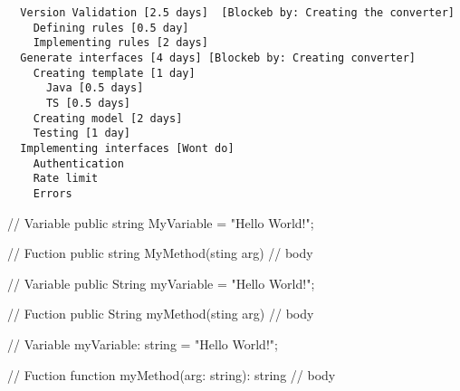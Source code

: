 \begin{itemize}
\begin{verbatim}
  Version Validation [2.5 days]  [Blockeb by: Creating the converter]
    Defining rules [0.5 day]
    Implementing rules [2 days]
  Generate interfaces [4 days] [Blockeb by: Creating converter]
    Creating template [1 day]
      Java [0.5 days]
      TS [0.5 days]
    Creating model [2 days]
    Testing [1 day]
  Implementing interfaces [Wont do]
    Authentication
    Rate limit
    Errors
    \end{verbatim}
    

\begin{csharp}
// Variable
public string MyVariable = "Hello World!";

// Fuction
public string MyMethod(sting arg)
{
  // body
}
\end{csharp}

\begin{java}
// Variable
public String myVariable = "Hello World!";

// Fuction
public String myMethod(sting arg)
{
  // body
}
\end{java}

\begin{typescript}
// Variable
myVariable: string = "Hello World!";

// Fuction
function myMethod(arg: string): string
{
  // body
}
\end{typescript}


\end{itemize}


